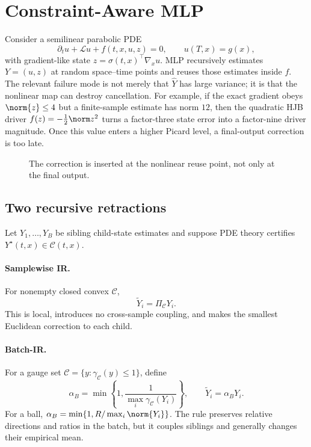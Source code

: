 \section{Constraint-Aware MLP}
Consider a semilinear parabolic PDE
\begin{equation}
\partial_tu+\mathcal Lu+f(t,x,u,z)=0,\qquad u(T,x)=g(x),
\label{eq:pde}
\end{equation}
with gradient-like state $z=\sigma(t,x)^\top\nabla_xu$. MLP recursively estimates $Y=(u,z)$ at random space--time points and reuses those estimates inside $f$. The relevant failure mode is not merely that $\widehat Y$ has large variance; it is that the nonlinear map can destroy cancellation. For example, if the exact gradient obeys $\norm{z}\le 4$ but a finite-sample estimate has norm $12$, then the quadratic HJB driver $f(z)=-\tfrac12\norm z^2$ turns a factor-three state error into a factor-nine driver magnitude. Once this value enters a higher Picard level, a final-output correction is too late.

\begin{figure}[t]
\centering
\setlength{\fboxsep}{4pt}
\caption{The correction is inserted at the nonlinear reuse point, not only at the final output.}
\label{fig:interface}
\end{figure}

\subsection{Two recursive retractions}
Let $Y_1,\ldots,Y_B$ be sibling child-state estimates and suppose PDE theory certifies $Y^\star(t,x)\in\mathcal C(t,x)$.

\paragraph{Samplewise IR.}
For nonempty closed convex $\mathcal C$,
\begin{equation}
\widetilde Y_i=\Pi_{\mathcal C}Y_i.
\label{eq:samplewise}
\end{equation}
This is local, introduces no cross-sample coupling, and makes the smallest Euclidean correction to each child.

\paragraph{Batch-IR.}
For a gauge set $\mathcal C=\{y:\gamma_{\mathcal C}(y)\le1\}$, define
\begin{equation}
\alpha_B=\min\!\left\{1,\frac{1}{\max_i\gamma_{\mathcal C}(Y_i)}\right\},
\qquad \widetilde Y_i=\alpha_BY_i.
\label{eq:batch}
\end{equation}
For a ball, $\alpha_B=\min\{1,R/\max_i\norm{Y_i}\}$. The rule preserves relative directions and ratios in the batch, but it couples siblings and generally changes their empirical mean.

